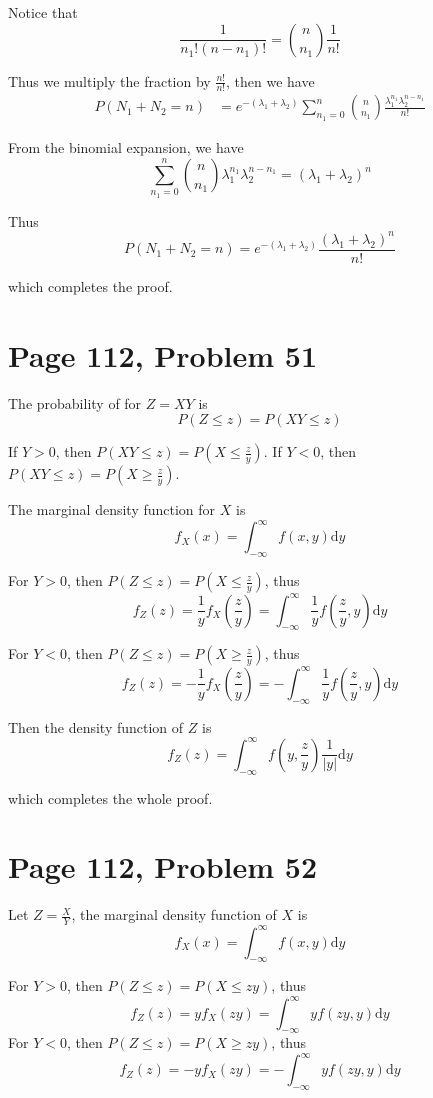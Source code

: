 \documentclass[a4paper, UTF-8]{article}
\theoremstyle{plain}
\begin{document}
Notice that 
$$
\frac{1}{n_1!(n - n_1)!} = \binom{n}{n_1} \frac{1}{n!}
$$

Thus we multiply the fraction by $\frac{n!}{n!}$, then we have
\begin{align*}
P(N_1 + N_2 = n) &= e^{-(\lambda_1 + \lambda_2)} \sum_{n_1 = 0}^n \binom{n}{n_1} \frac{\lambda_1^{n_1}\lambda_2^{n - n_1}}{n!} 
\end{align*}

From the binomial expansion, we have
$$
\sum_{n_1 = 0}^n \binom{n}{n_1} \lambda_1^{n_1}\lambda_2^{n - n_1} = (\lambda_1 + \lambda_2)^n
$$

Thus 
$$
P(N_1 + N_2 = n) = e^{-(\lambda_1 + \lambda_2)} \frac{(\lambda_1 + \lambda_2)^n}{n!}
$$

which completes the proof.

\section{Page 112, Problem 51}

The probability of for $Z = XY$ is 
$$
P(Z \leq z) = P(XY \leq z)
$$

If $Y > 0$, then $P(XY \leq z) = P(X \leq \frac{z}{y})$. If $Y < 0$, then $P(XY \leq z) = P(X \geq \frac{z}{y})$.

The marginal density function for $X$ is 
$$
f_X(x) = \int_{-\infty}^\infty f(x,y) \mathrm{d}y
$$

For $Y > 0$, then $P(Z \leq z) = P(X \leq \frac{z}{y})$, thus 
$$
f_Z(z) = \frac{1}{y} f_X(\frac{z}{y}) = \int_{-\infty}^\infty \frac{1}{y} f(\frac{z}{y}, y) \mathrm{d}y
$$

For $Y < 0$, then $P(Z \leq z) = P(X \geq \frac{z}{y})$, thus
$$
f_Z(z) = -\frac{1}{y} f_X(\frac{z}{y}) = -\int_{-\infty}^\infty \frac{1}{y} f(\frac{z}{y}, y) \mathrm{d}y
$$

Then the density function of $Z$ is
$$
f_Z(z) = \int_{-\infty}^\infty f(y, \frac{z}{y}) \frac{1}{|y|} \mathrm{d}y
$$

which completes the whole proof.

\section{Page 112, Problem 52}

Let $Z = \frac{X}{Y}$, the marginal density function of $X$ is 
$$
f_X(x) = \int_{-\infty}^\infty f(x,y) \mathrm{d}y
$$

For $Y > 0$, then $P(Z \leq z) = P(X \leq zy)$, thus
$$
f_Z(z) = y f_X(zy) = \int_{-\infty}^\infty y f(zy, y) \mathrm{d}y
$$
For $Y < 0$, then $P(Z \leq z) = P(X \geq zy)$, thus
$$
f_Z(z) = -y f_X(zy) = -\int_{-\infty}^\infty y f(zy, y) \mathrm{d}y
$$
\end{document}
